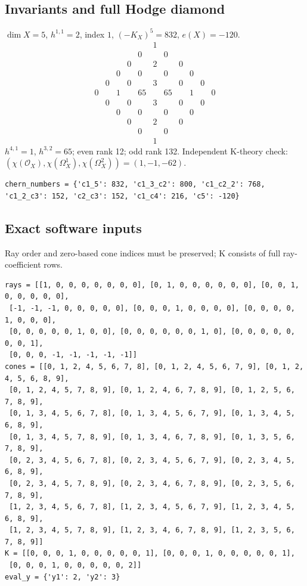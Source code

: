\documentclass[10pt,a4paper]{article}
\begin{document}
\subsection*{Invariants and full Hodge diamond}
$\dim X=5$, $h^{1,1}=2$, index $1$, $(-K_X)^5=832$, $e(X)=-120$.
\[\begin{array}{ccccccccccc}&&&&&1&&&&&\\&&&&0&&0&&&&\\&&&0&&2&&0&&&\\&&0&&0&&0&&0&&\\&0&&0&&3&&0&&0&\\0&&1&&65&&65&&1&&0\\&0&&0&&3&&0&&0&\\&&0&&0&&0&&0&&\\&&&0&&2&&0&&&\\&&&&0&&0&&&&\\&&&&&1&&&&&\end{array}\]
$h^{4,1}=1$, $h^{3,2}=65$; even rank 12; odd rank 132.
Independent K-theory check: $(\chi(\mathcal O_X),\chi(\Omega_X^1),\chi(\Omega_X^2))=(1, -1, -62)$.
\begin{lstlisting}
chern_numbers = {'c1_5': 832, 'c1_3_c2': 800, 'c1_c2_2': 768, 'c1_2_c3': 152, 'c2_c3': 152, 'c1_c4': 216, 'c5': -120}
\end{lstlisting}
\subsection*{Exact software inputs}
Ray order and zero-based cone indices must be preserved; K consists of full ray-coefficient rows.
\begin{lstlisting}
rays = [[1, 0, 0, 0, 0, 0, 0, 0], [0, 1, 0, 0, 0, 0, 0, 0], [0, 0, 1, 0, 0, 0, 0, 0],
 [-1, -1, -1, 0, 0, 0, 0, 0], [0, 0, 0, 1, 0, 0, 0, 0], [0, 0, 0, 0, 1, 0, 0, 0],
 [0, 0, 0, 0, 0, 1, 0, 0], [0, 0, 0, 0, 0, 0, 1, 0], [0, 0, 0, 0, 0, 0, 0, 1],
 [0, 0, 0, -1, -1, -1, -1, -1]]
cones = [[0, 1, 2, 4, 5, 6, 7, 8], [0, 1, 2, 4, 5, 6, 7, 9], [0, 1, 2, 4, 5, 6, 8, 9],
 [0, 1, 2, 4, 5, 7, 8, 9], [0, 1, 2, 4, 6, 7, 8, 9], [0, 1, 2, 5, 6, 7, 8, 9],
 [0, 1, 3, 4, 5, 6, 7, 8], [0, 1, 3, 4, 5, 6, 7, 9], [0, 1, 3, 4, 5, 6, 8, 9],
 [0, 1, 3, 4, 5, 7, 8, 9], [0, 1, 3, 4, 6, 7, 8, 9], [0, 1, 3, 5, 6, 7, 8, 9],
 [0, 2, 3, 4, 5, 6, 7, 8], [0, 2, 3, 4, 5, 6, 7, 9], [0, 2, 3, 4, 5, 6, 8, 9],
 [0, 2, 3, 4, 5, 7, 8, 9], [0, 2, 3, 4, 6, 7, 8, 9], [0, 2, 3, 5, 6, 7, 8, 9],
 [1, 2, 3, 4, 5, 6, 7, 8], [1, 2, 3, 4, 5, 6, 7, 9], [1, 2, 3, 4, 5, 6, 8, 9],
 [1, 2, 3, 4, 5, 7, 8, 9], [1, 2, 3, 4, 6, 7, 8, 9], [1, 2, 3, 5, 6, 7, 8, 9]]
K = [[0, 0, 0, 1, 0, 0, 0, 0, 0, 1], [0, 0, 0, 1, 0, 0, 0, 0, 0, 1],
 [0, 0, 0, 1, 0, 0, 0, 0, 0, 2]]
eval_y = {'y1': 2, 'y2': 3}
\end{lstlisting}
\end{document}
